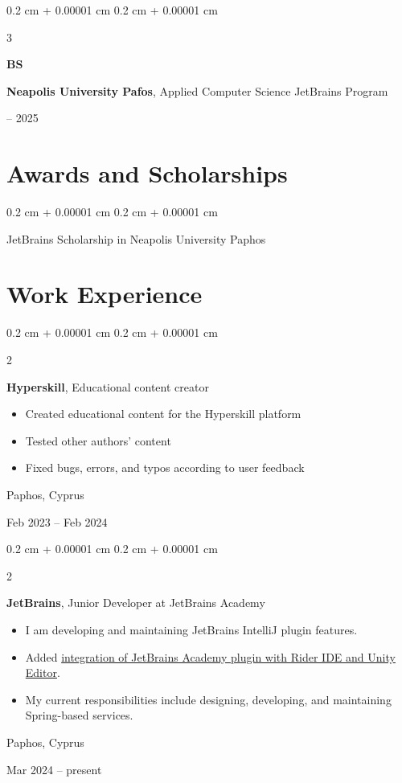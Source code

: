 \documentclass[10pt, letterpaper]{article}
\newenvironment{highlights}{
    \begin{itemize}[
        topsep=0.10 cm,
        parsep=0.10 cm,
        partopsep=0pt,
        itemsep=0pt,
        leftmargin=0.4 cm + 10pt
    ]
}{
    \end{itemize}
} %
\newenvironment{onecolentry}{
    \begin{adjustwidth}{
        0.2 cm + 0.00001 cm
    }{
        0.2 cm + 0.00001 cm
    }
}{
    \end{adjustwidth}
} %
\newenvironment{twocolentry}[2][]{
    \onecolentry
    \def\secondColumn{#2}
    \setcolumnwidth{\fill, 4.5 cm}
    \begin{paracol}{2}
}{
    \switchcolumn \raggedleft \secondColumn
    \end{paracol}
    \endonecolentry
} %
\newenvironment{threecolentry}[3][]{
    \onecolentry
    \def\thirdColumn{#3}
    \setcolumnwidth{1 cm, \fill, 4.5 cm}
    \begin{paracol}{3}
    {\raggedright #2} \switchcolumn
}{
    \switchcolumn \raggedleft \thirdColumn
    \end{paracol}
    \endonecolentry
} %
\begin{document}
        \begin{threecolentry}{\textbf{BS}}{
            2023 – 2025
        }
            \textbf{Neapolis University Pafos}, Applied Computer Science JetBrains Program
        \end{threecolentry}


    
    \section{Awards and Scholarships}



        
        \begin{onecolentry}
            JetBrains Scholarship in Neapolis University Paphos
        \end{onecolentry}


    
    \section{Work Experience}



        
        \begin{twocolentry}{
            Paphos, Cyprus

        Feb 2023 – Feb 2024
        }
            \textbf{Hyperskill}, Educational content creator
            \begin{highlights}
                \item Created educational content for the Hyperskill platform
                \item Tested other authors' content
                \item Fixed bugs, errors, and typos according to user feedback
            \end{highlights}
        \end{twocolentry}


        \vspace{0.2 cm}

        \begin{twocolentry}{
            Paphos, Cyprus

        Mar 2024 – present
        }
            \textbf{JetBrains}, Junior Developer at JetBrains Academy
            \begin{highlights}
                \item I am developing and maintaining JetBrains IntelliJ plugin features.
                \item Added \href{https://drive.google.com/file/d/1WoW1RgmzC_QNE1PJSZ3Bqexz9DNVAvin/view?usp=sharing}{integration of JetBrains Academy plugin with Rider IDE and Unity Editor}.
                \item My current responsibilities include designing, developing, and maintaining Spring-based services.
            \end{highlights}
        \end{twocolentry}
\end{document}
